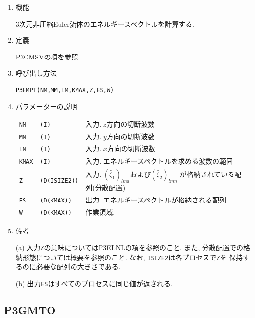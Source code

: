 \documentclass[a4j,fleqn]{jarticle}
\begin{document}
\begin{enumerate}

\item 機能

3次元非圧縮Euler流体のエネルギースペクトルを計算する.

\item 定義

P3CMSVの項を参照.

\item 呼び出し方法

{\tt P3EMPT(NM,MM,LM,KMAX,Z,ES,W)}
  
\item パラメーターの説明

\begin{tabular}{lll}
{\tt NM} & {\tt (I)} & 入力. $z$方向の切断波数\\
{\tt MM} & {\tt (I)} & 入力. $y$方向の切断波数\\
{\tt LM} & {\tt (I)} & 入力. $x$方向の切断波数\\
{\tt KMAX} & {\tt (I)} & 入力. エネルギースペクトルを求める波数の範囲\\
{\tt Z} & {\tt (D(ISIZE2))} &
 入力. $(\hat{\zeta}_1)_{lmn}$および$(\hat{\zeta}_2)_{lmn}$
  が格納されている配列(分散配置)\\
{\tt ES} & {\tt (D(KMAX))} & 出力. エネルギースペクトルが格納される配列\\
{\tt W} & {\tt (D(KMAX))} & 作業領域.
\end{tabular}

\item 備考

(a) 入力{\tt Z}の意味についてはP3ELNLの項を参照のこと.
    また, 分散配置での格納形態については概要を参照のこと.
    なお, {\tt ISIZE2}は各プロセスで{\tt Z}を
    保持するのに必要な配列の大きさである.

(b) 出力{\tt ES}はすべてのプロセスに同じ値が返される.

\end{enumerate}


\subsection{P3GMTO}
\end{document}
